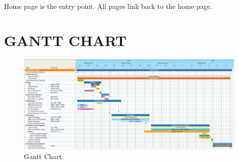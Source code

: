 \documentclass[12pt]{article}
\begin{document}
\par{Home page is the entry point. All pages link back to the home page.}
\newpage
\section{GANTT CHART}
\begin{landscape}
	\begin{figure}[htp]
	\begin{adjustwidth}{-0.7cm}{0cm}
\centering
\includegraphics[scale=0.58]{Project_Plan/docs/gant_chart_01.PNG}
\caption{Gantt Chart}
\label{Gantt Chart}
\end{adjustwidth}
\end{figure}
\end{landscape}
\restoregeometry
\newpage
\end{document}
